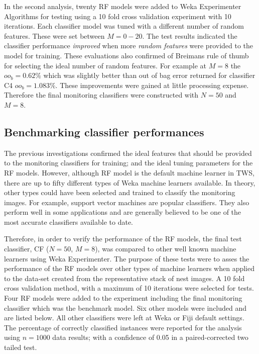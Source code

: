 In the second analysis, twenty \ac{RF} models were added to Weka Experimenter Algorithms for testing using a 10 fold cross validation experiment with 10 iterations. Each classifier model was tuned with a different number of random features. These were set between $M = 0 - 20$. The test results indicated the classifier performance \emph{improved} when more \emph{random features} were provided to the model for training. These evaluations also confirmed of Breimans \cite{Breiman2001} rule of thumb for selecting the ideal number of random features. For example at $M = 8$ the $oo_b =  0.62\%$ which was slightly better than out of bag error returned for classifier C4 $oo_b = 1.083\%$. These improvements were gained at little processing expense. Therefore the final monitoring classifiers were constructed with $N = 50$ and $M = 8$. 

\subsection{Benchmarking classifier performances}
The previous investigations confirmed the ideal features that should be provided to the monitoring classifiers for training; and the ideal tuning parameters for the \ac{RF} models.  However, although \ac{RF} model is the default machine learner in \ac{TWS}, there are up to fifty different types of Weka machine learners available. In theory, other types could have been selected and trained to classify the monitoring images. For example, support vector machines are popular classifiers. They also perform well in some applications and are generally believed to be one of the most accurate classifiers available to date.

Therefore, in order to verify the performance of the \ac{RF} models, the final test classifier, CF ($ N = 50 $, $ M = 8 $), was compared to other well known machine learners using Weka Experimenter. The purpose of these tests were to asses the performance of the \ac{RF} models over other types of machine learners when applied to the data-set created from the representative stack of nest images. A 10 fold cross validation method, with a maximum of 10 iterations were selected for tests. Four \ac{RF} models were added to the experiment including the final monitoring classifier which was the benchmark model. Six other models were included and are listed below. All other classifiers were left at Weka or Fiji default settings. The percentage of correctly classified instances were reported for the analysis using $n = 1000$ data results; with a confidence of 0.05 in a paired-corrected two tailed test.

